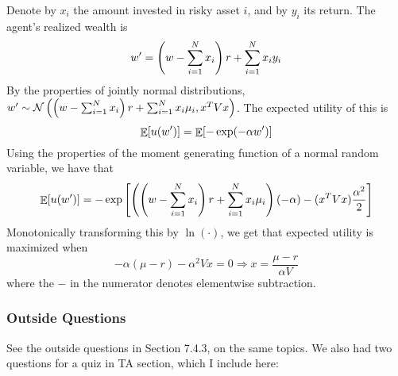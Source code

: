\documentclass[12pt]{article}
\begin{document}
\begin{itemize}
	Denote by $x_i$ the amount invested in risky asset $i$, and by $y_i$ its return. The agent's realized wealth is
	\[
	w' = \left( w - \sum_{i=1}^N x_i\right) r + \sum_{i=1}^N x_i y_i
	\]
	By the properties of jointly normal distributions, $w' \sim \mathcal{N}\left( \left( w - \sum_{i=1}^N x_i\right) r + \sum_{i=1}^N x_i \mu_i, x^{T} V x\right)$. The expected utility of this is
	\[
	\mathop{\mathbb{E}}[u(w')] = \mathop{\mathbb{E}}[-\exp(-\alpha w')]
	\]
	Using the properties of the moment generating function of a normal random variable, we have that
	\[
	\mathop{\mathbb{E}}[u(w')] = -\exp\left[\left( \left( w - \sum_{i=1}^N x_i\right) r + \sum_{i=1}^N x_i \mu_i\right)(-\alpha) - (x^T Vx) \frac{\alpha^2}{2}\right]
	\]
	Monotonically transforming this by $\ln(\cdot)$, we get that expected utility is maximized when
	\[
	-\alpha (\mu - r) - \alpha^2 Vx = 0 \Longrightarrow x = \frac{\mu - r}{\alpha V}
	\]
	where the $-$ in the numerator denotes elementwise subtraction.
\end{itemize}
\subsubsection{Outside Questions}

See the outside questions in Section 7.4.3, on the same topics. We also had two questions for a quiz in TA section, which I include here:
\end{document}
